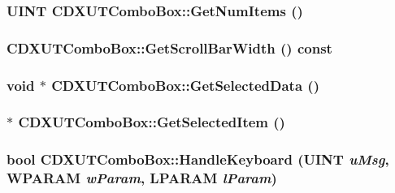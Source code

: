 \label{class_c_d_x_u_t_combo_box_a25cd3ea3c6094505c29ca6bf2c90d4af}
\hypertarget{class_c_d_x_u_t_combo_box_a4706b4e1da4030d3107b76885a27e3e9}{
\subsubsection[{GetNumItems}]{\setlength{\rightskip}{0pt plus 5cm}UINT CDXUTComboBox::GetNumItems ()}}
\label{class_c_d_x_u_t_combo_box_a4706b4e1da4030d3107b76885a27e3e9}
\hypertarget{class_c_d_x_u_t_combo_box_a47644eab0287801bf65a37fe9c03989b}{
\subsubsection[{GetScrollBarWidth}]{ CDXUTComboBox::GetScrollBarWidth () const}}
\label{class_c_d_x_u_t_combo_box_a47644eab0287801bf65a37fe9c03989b}
\hypertarget{class_c_d_x_u_t_combo_box_abaf5f86c0e1f652aa1f71a8cbc63122a}{
\subsubsection[{GetSelectedData}]{\setlength{\rightskip}{0pt plus 5cm}void $\ast$ CDXUTComboBox::GetSelectedData ()}}
\label{class_c_d_x_u_t_combo_box_abaf5f86c0e1f652aa1f71a8cbc63122a}
\hypertarget{class_c_d_x_u_t_combo_box_a99d3048050a0e6934ecc6140d350f222}{
\subsubsection[{GetSelectedItem}]{ $\ast$ CDXUTComboBox::GetSelectedItem ()}}
\label{class_c_d_x_u_t_combo_box_a99d3048050a0e6934ecc6140d350f222}
\hypertarget{class_c_d_x_u_t_combo_box_abe59d59e89767472038d69260ef73f9d}{
\subsubsection[{HandleKeyboard}]{\setlength{\rightskip}{0pt plus 5cm}bool CDXUTComboBox::HandleKeyboard (UINT {\em uMsg}, \/  WPARAM {\em wParam}, \/  LPARAM {\em lParam})}}
\label{class_c_d_x_u_t_combo_box_abe59d59e89767472038d69260ef73f9d}


